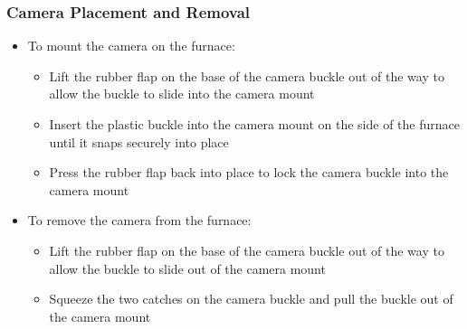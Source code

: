 \documentclass[letterpaper,11pt]{article}
\begin{document}
    \subsubsection{Camera Placement and Removal}  \label{sec:cam_on_furn}
        \begin{itemize}
        \item To mount the camera on the furnace:
            \begin{itemize}
            \item Lift the rubber flap on the base of the camera buckle 
                out of the way to allow the buckle to slide into the camera 
                mount 
            \item Insert the plastic buckle into the camera mount on the side 
                of the furnace until it snaps securely into place
            \item Press the rubber flap back into place to lock the camera 
                buckle into the camera mount 
            \end{itemize}
        \item To remove the camera from the furnace:
            \begin{itemize}
            \item Lift the rubber flap on the base of the camera buckle 
                out of the way to allow the buckle to slide out of the camera 
                mount
            \item Squeeze the two catches on the camera buckle and pull the 
                buckle out of the camera mount
            \end{itemize}
        \end{itemize}
    
\end{document}
